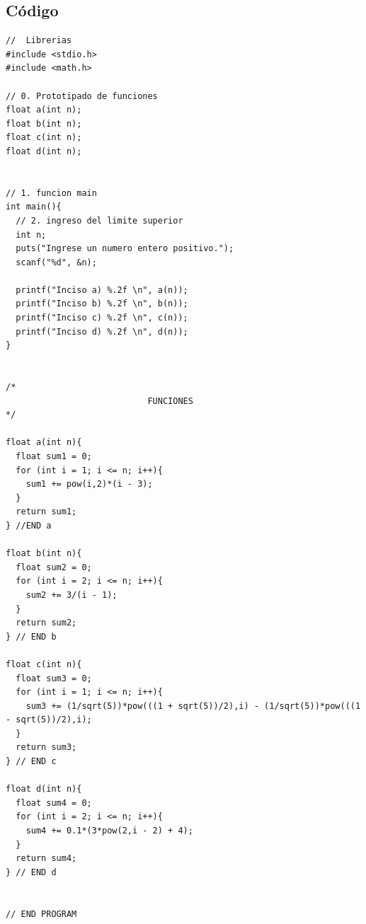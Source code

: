 \subsection{Código}
\begin{lstlisting}
//	Librerias
#include <stdio.h>
#include <math.h>

// 0. Prototipado de funciones
float a(int n);
float b(int n);
float c(int n);
float d(int n);


// 1. funcion main
int main(){
  // 2. ingreso del limite superior
  int n;
  puts("Ingrese un numero entero positivo.");
  scanf("%d", &n);

  printf("Inciso a) %.2f \n", a(n));
  printf("Inciso b) %.2f \n", b(n));
  printf("Inciso c) %.2f \n", c(n));
  printf("Inciso d) %.2f \n", d(n));
}


/*
                            FUNCIONES
*/

float a(int n){
  float sum1 = 0;
  for (int i = 1; i <= n; i++){
    sum1 += pow(i,2)*(i - 3);
  }
  return sum1;
} //END a

float b(int n){
  float sum2 = 0;
  for (int i = 2; i <= n; i++){
    sum2 += 3/(i - 1);
  }
  return sum2;
} // END b

float c(int n){
  float sum3 = 0;
  for (int i = 1; i <= n; i++){
    sum3 += (1/sqrt(5))*pow(((1 + sqrt(5))/2),i) - (1/sqrt(5))*pow(((1 - sqrt(5))/2),i);
  }
  return sum3;
} // END c

float d(int n){
  float sum4 = 0;
  for (int i = 2; i <= n; i++){
    sum4 += 0.1*(3*pow(2,i - 2) + 4);
  }
  return sum4;
} // END d


// END PROGRAM
\end{lstlisting}













